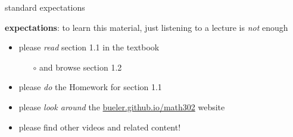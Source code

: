 \documentclass{beamer}
\begin{document}
\begin{frame}{standard expectations}

\textbf{expectations}:  to learn this material, just listening to a lecture is \emph{not} enough
\begin{itemize}
\item please \alert{\emph{read} section 1.1 in the textbook}
    \begin{itemize}
    \item[$\circ$] and browse section 1.2
    \end{itemize}
\item please \alert{\emph{do} the Homework for section 1.1}
\item please \emph{look around} the \href{https://bueler.github.io/math302/}{\alert{bueler.github.io/math302}} website
\item please find other videos and related content!
\end{itemize}
\end{frame}
\end{document}
